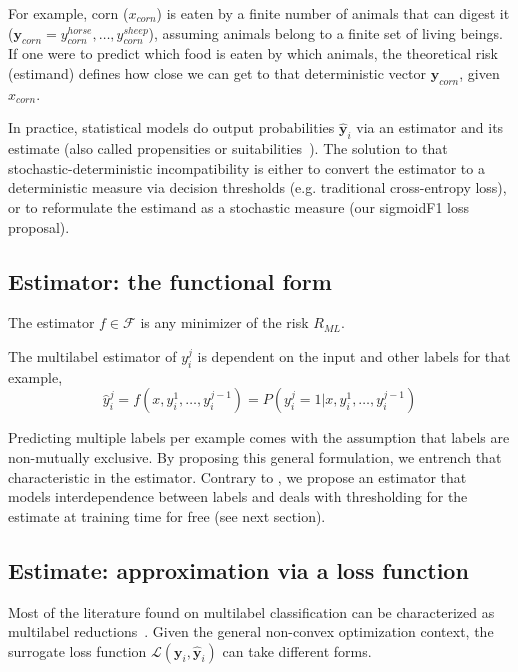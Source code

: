 For example, corn ($x_{corn}$) is eaten by a finite number of animals that can digest it ($\mathbf{y}_{corn} = {y_{corn}^{horse}, \ldots, y_{corn}^{sheep}} $), assuming animals belong to a finite set of living beings. If one were to predict which food is eaten by which animals, the theoretical risk (estimand) defines how close we can get to that deterministic vector $\mathbf{y}_{corn}$, given $x_{corn}$.
\fi

In practice, statistical models do output probabilities $\mathbf{\hat{y}}_{i}$ via an estimator and its estimate (also called propensities or suitabilities~\citep{multilabelReduction}). The solution to that stochastic-deterministic incompatibility is either to convert the estimator to a deterministic measure via decision thresholds (e.g. traditional cross-entropy loss), or to reformulate the estimand as a stochastic measure (our sigmoidF1 loss proposal).

\subsection{Estimator: the functional form}
\label{section:background:estimator}

The estimator $f \in \mathcal{F}$ is any minimizer of the risk $R_{ML}$. 

\begin{proposition}
  The multilabel estimator of $y_{i}^{j}$ is dependent on the input and other labels for that example,
%
\begin{equation}
  \hat{y}_i^j = f(x, y_{i}^{1}, \ldots, y_{i}^{j-1}) = P(y_i^j = 1 | x, y_{i}^{1}, \ldots, y_{i}^{j-1})
\end{equation}
\label{eq:estimand}
\end{proposition}
%
Predicting multiple labels per example comes with the assumption that labels are non-mutually exclusive. By proposing this general formulation, we entrench that characteristic in the estimator. Contrary to \citet{multilabelReduction}, we propose an estimator that models interdependence between labels and deals with thresholding for the estimate at training time for free (see next section).


\subsection{Estimate: approximation via a loss function}
\label{section:background:estimate}

Most of the literature found on multilabel classification can be characterized as multilabel reductions~\cite{multilabelReduction}. Given the general non-convex optimization context, the surrogate loss function $\mathcal{L}(\mathbf{y}_i, \hat{\mathbf{y}}_i)$ can take different forms. 


